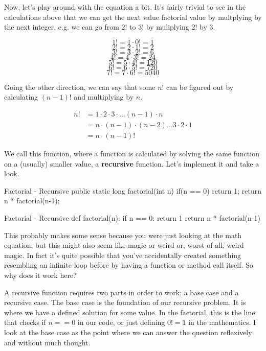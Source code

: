 Now, let's play around with the equation a bit.  It's fairly trivial to see in the calculations above that we can get the next value factorial value by multplying by the next integer, e.g. we can go from $2!$ to $3!$ by muliplying $2!$ by $3$.

$$1! = 1 \cdot 0! = 1$$
$$2! = 2 \cdot 1! = 2$$
$$3! = 3 \cdot 2! = 6$$
$$4! = 4 \cdot 3! = 24$$
$$5! = 5 \cdot 4! = 120$$
$$6! = 6 \cdot 5! = 720$$
$$7! = 7 \cdot 6! = 5040$$

Going the other direction, we can say that some $n!$ can be figured out by calculating $(n-1)!$ and multiplying by $n$. 



\begin{equation} \label{eq:fact-recus}
	\begin{split}
		n! & = 1\cdot2\cdot3\cdot\dots (n-1)\cdot n \\
		& = n \cdot (n-1) \cdot (n-2) \dots 3 \cdot 2 \cdot 1   \\
		& = n \cdot (n-1)!
	\end{split}
\end{equation}

We call this function, where a function is calculated by solving the same function on a (usually) smaller value, a \textbf{recursive} function.
Let's implement it and take a look.

\begin{javacode}[label={code:factrecurjava}]{Factorial - Recursive}
public static long factorial(int n) {
	if(n == 0) {
		return 1;
	}
	return n * factorial(n-1);
}\end{javacode}

\begin{pycode}[label={code:factrecurpy}]{Factorial - Recursive}
def factorial(n):
	if n == 0:
		return 1
	return n * factorial(n-1)\end{pycode}



This probably makes some sense because you were just looking at the math equation, but this might also seem like magic or weird or, worst of all, weird magic.  In fact it's quite possible that you've accidentally created something resembling an infinite loop before by having a function or method call itself.  So why does it work here?


A recursive function requires two parts in order to work: a base case and a recursive case.  
The base case is the foundation of our recursive problem.  
It is where we have a defined solution for some value.
In the factorial, this is the line that checks  if  $n == 0$ in our code, or just defining $0! = 1$ in the mathematics.
I look at the base case as the point where we can answer the question reflexively and without much thought.



